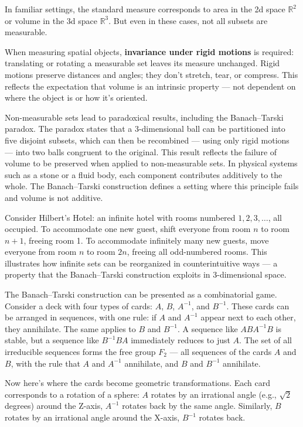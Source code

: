 In familiar settings, the standard measure corresponds to area in the 2d space $\mathbb{R}^2$ or volume in the 3d space $\mathbb{R}^3$. But even in these cases, not all subsets are measurable.

When measuring spatial objects, \textbf{invariance under rigid motions} is required: translating or rotating a measurable set leaves its measure unchanged. Rigid motions preserve distances and angles; they don’t stretch, tear, or compress. This reflects the expectation that volume is an intrinsic property — not dependent on where the object is or how it's oriented.

Non-measurable sets lead to paradoxical results, including the Banach–Tarski paradox. The paradox states that a 3-dimensional ball can be partitioned into five disjoint subsets, which can then be recombined — using only rigid motions — into two balls congruent to the original. This result reflects the failure of volume to be preserved when applied to non-measurable sets. In physical systems such as a stone or a fluid body, each component contributes additively to the whole. The Banach–Tarski construction defines a setting where this principle fails and volume is not additive.

Consider Hilbert's Hotel: an infinite hotel with rooms numbered $1, 2, 3, \ldots$, all occupied. To accommodate one new guest, shift everyone from room $n$ to room $n+1$, freeing room 1. To accommodate infinitely many new guests, move everyone from room $n$ to room $2n$, freeing all odd-numbered rooms. This illustrates how infinite sets can be reorganized in counterintuitive ways — a property that the Banach–Tarski construction exploits in 3-dimensional space.

The Banach–Tarski construction can be presented as a combinatorial game. Consider a deck with four types of cards: $A$, $B$, $A^{-1}$, and $B^{-1}$. These cards can be arranged in sequences, with one rule: if $A$ and $A^{-1}$ appear next to each other, they annihilate. The same applies to $B$ and $B^{-1}$. A sequence like $ABA^{-1}B$ is stable, but a sequence like $B^{-1}BA$ immediately reduces to just $A$. The set of all irreducible sequences forms the free group $F_2$ — all sequences of the cards $A$ and $B$, with the rule that $A$ and $A^{-1}$ annihilate, and $B$ and $B^{-1}$ annihilate.

Now here's where the cards become geometric transformations. Each card corresponds to a rotation of a sphere: $A$ rotates by an irrational angle (e.g., $\sqrt{2}$ degrees) around the Z-axis, $A^{-1}$ rotates back by the same angle. Similarly, $B$ rotates by an irrational angle around the X-axis, $B^{-1}$ rotates back.

